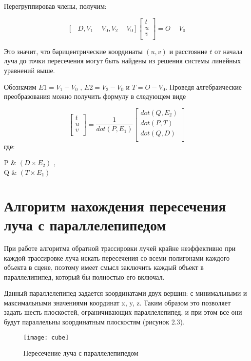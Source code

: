 \documentclass[12pt,a4paper,oneside]{report}
\makeatletter
\newenvironment{conditions_eq*}
{\par\vspace{\abovedisplayskip}\noindent
	\tabularx{\columnwidth}{>{$}l<{$} @{${}={}$} >{\raggedright\arraybackslash}X}}
{\endtabularx\par\vspace{\belowdisplayskip}}
\makeatother
\begin{document}
	 Перегруппировав члены, получим:
	\def\C{
		\begin{bmatrix}
			t \\
			u \\
			v\\
	\end{bmatrix}}

	\begin{equation}
	\left[ -D, V_1 - V_0, V_2 - V_0\right] \C = O - V_0
	\end{equation}
	
	 Это значит, что барицентрические координаты $(u, v)$  и расстояние $t$  от начала луча до точки пересечения могут быть найдены из решения системы линейных уравнений выше.
	
	 Обозначим $E1 = V_1 - V_0$ , $E2 = V_2 - V_0$ и $T = O - V_0$. Проведя алгебраические преобразования можно получить формулу в следующем виде
	\def\D{
		\begin{bmatrix}
			dot(Q, E_2)\\
			dot(P, T)\\
			dot(Q, D)\\
	\end{bmatrix}}

	\begin{equation}
	\C = \frac{1}{dot(P, E_1)} \D
	\end{equation}
	где:
	
	\begin{conditions_eq*}
		P & $(D \times E_2)$ ,\\
		Q & $(T \times E_1)$
	\end{conditions_eq*}

	\section{Алгоритм нахождения пересечения луча с параллелепипедом}
	 \quad При работе алгоритма обратной трассировки лучей крайне неэффективно при каждой трассировке луча искать пересечения со всеми полигонами каждого объекта в сцене, поэтому имеет смысл заключить каждый объект в параллелипипед, который бы полностью его включал.
	
	 Данный параллелепипед задается координатами двух вершин: с минимальными и максимальными значениями координат x, y, z. Таким образом это позволяет задать шесть плоскостей, ограничивающих параллелепипед, и при этом  все они будут параллельны координатным плоскостям (рисунок 2.3).
	
	\begin{figure}[h]
		\centering
		\texttt{[image: cube]}
		\caption{Пересечение луча с параллелепипедом}
	\end{figure}
\end{document}
